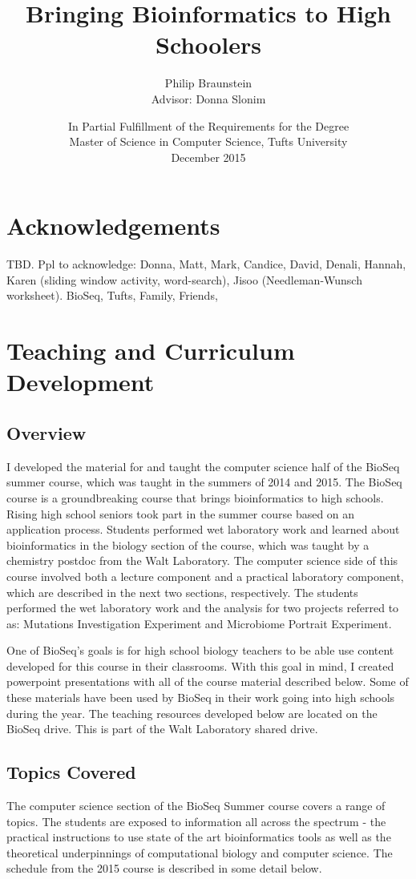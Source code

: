 \documentclass{report}
\title{Bringing Bioinformatics to High Schoolers}
\author{Philip Braunstein\\ Advisor: Donna Slonim}
\date{
In Partial Fulfillment of the Requirements for the Degree \\
Master of Science in Computer Science, Tufts University \\
December 2015
}
\begin{document}

\maketitle

\chapter*{Acknowledgements}
TBD. Ppl to acknowledge:
Donna, Matt, Mark, Candice, David, Denali, Hannah, Karen (sliding window activity, word-search), Jisoo (Needleman-Wunsch worksheet).  BioSeq, Tufts, Family, Friends,

\tableofcontents

\chapter{Teaching and Curriculum Development}
\section{Overview}
I developed the material for and taught the computer science half of the BioSeq summer course, which was taught in the summers of 2014 and 2015. The BioSeq course is a groundbreaking course that brings bioinformatics to high schools. Rising high school seniors took part in the summer course based on an application process. Students performed wet laboratory work and learned about bioinformatics in the biology section of the course, which was taught by a chemistry postdoc from the Walt Laboratory. The computer science side of this course involved both a lecture component and a practical laboratory component, which are described in the next two sections, respectively. The students performed the wet laboratory work and the analysis for two projects referred to as: Mutations Investigation Experiment and Microbiome Portrait Experiment. 

One of BioSeq's goals is for high school biology teachers to be able use content developed for this course in their classrooms. With this goal in mind, I created powerpoint presentations with all of the course material described below. Some of these materials have been used by BioSeq in their work going into high schools during the year. The teaching resources developed below are located on the BioSeq drive. This is part of the Walt Laboratory shared drive.

\section{Topics Covered}
The computer science section of the BioSeq Summer course covers a range of topics. The students are exposed to information all across the spectrum - the practical instructions to use state of the art bioinformatics tools as well as the theoretical underpinnings of computational biology and computer science. The schedule from the 2015 course is described in some detail below. 
\end{document}
